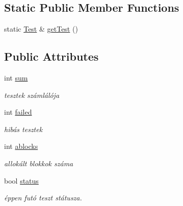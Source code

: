 \subsection*{Static Public Member Functions}
\begin{DoxyCompactItemize}
\item 
static \mbox{\hyperlink{structgtest__lite_1_1_test}{Test}} \& \mbox{\hyperlink{structgtest__lite_1_1_test_a532aa4c5e33e41ce8139b9c9098aa6f2}{get\+Test}} ()
\end{DoxyCompactItemize}
\subsection*{Public Attributes}
\begin{DoxyCompactItemize}
\item 
\mbox{\label{structgtest__lite_1_1_test_a6da678d43b72b9e2bff1c99e1d3c48f5}} 
int \mbox{\hyperlink{structgtest__lite_1_1_test_a6da678d43b72b9e2bff1c99e1d3c48f5}{sum}}
\begin{DoxyCompactList}\small\item\em tesztek számlálója \end{DoxyCompactList}\item 
\mbox{\label{structgtest__lite_1_1_test_a4fb6ee7bd903717d970e3f0504cdeeab}} 
int \mbox{\hyperlink{structgtest__lite_1_1_test_a4fb6ee7bd903717d970e3f0504cdeeab}{failed}}
\begin{DoxyCompactList}\small\item\em hibás tesztek \end{DoxyCompactList}\item 
\mbox{\label{structgtest__lite_1_1_test_a91d9c63794d2b9b49e0c48d897208560}} 
int \mbox{\hyperlink{structgtest__lite_1_1_test_a91d9c63794d2b9b49e0c48d897208560}{ablocks}}
\begin{DoxyCompactList}\small\item\em allokált blokkok száma \end{DoxyCompactList}\item 
\mbox{\label{structgtest__lite_1_1_test_a59a9a7f0ef7867af604ce5678f7a2c13}} 
bool \mbox{\hyperlink{structgtest__lite_1_1_test_a59a9a7f0ef7867af604ce5678f7a2c13}{status}}
\begin{DoxyCompactList}\small\item\em éppen futó teszt státusza. \end{DoxyCompactList}\item 

\end{DoxyCompactItemize}
